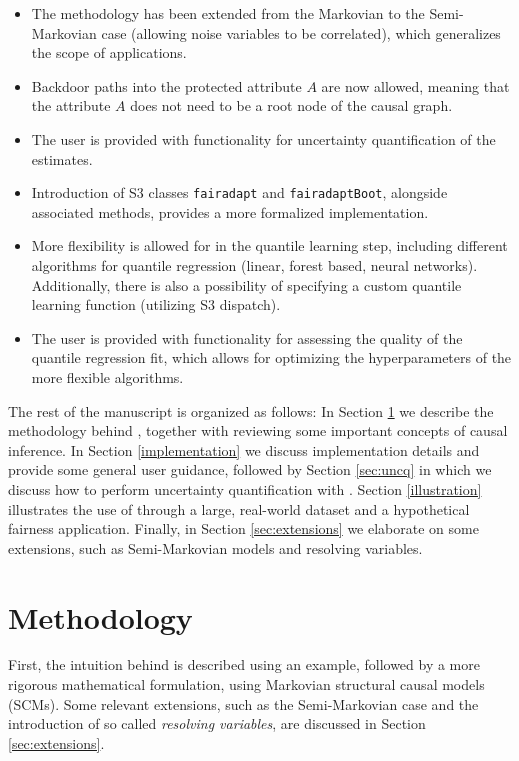 \documentclass[
  nojss]{jss}
\providecommand{\tightlist}{%
  \setlength{\itemsep}{0pt}\setlength{\parskip}{0pt}}
\begin{document}
\begin{itemize}
\tightlist
\item
  The methodology has been extended from the Markovian to the
  Semi-Markovian case (allowing noise variables to be correlated), which
  generalizes the scope of applications.
\item
  Backdoor paths into the protected attribute \(A\) are now allowed,
  meaning that the attribute \(A\) does not need to be a root node of
  the causal graph.
\item
  The user is provided with functionality for uncertainty quantification
  of the estimates.
\item
  Introduction of S3 classes \texttt{fairadapt} and
  \texttt{fairadaptBoot}, alongside associated methods, provides a more
  formalized implementation.
\item
  More flexibility is allowed for in the quantile learning step,
  including different algorithms for quantile regression (linear, forest
  based, neural networks). Additionally, there is also a possibility of
  specifying a custom quantile learning function (utilizing S3
  dispatch).
\item
  The user is provided with functionality for assessing the quality of
  the quantile regression fit, which allows for optimizing the
  hyperparameters of the more flexible algorithms.
\end{itemize}

The rest of the manuscript is organized as follows: In Section
\ref{methodology} we describe the methodology behind ,
together with reviewing some important concepts of causal inference. In
Section \ref{implementation} we discuss implementation details and
provide some general user guidance, followed by Section \ref{sec:uncq}
in which we discuss how to perform uncertainty quantification with
. Section \ref{illustration} illustrates the use of
 through a large, real-world dataset and a hypothetical
fairness application. Finally, in Section \ref{sec:extensions} we
elaborate on some extensions, such as Semi-Markovian models and
resolving variables.

\hypertarget{methodology}{%
\section{Methodology}\label{methodology}}

First, the intuition behind  is described using an
example, followed by a more rigorous mathematical formulation, using
Markovian structural causal models (SCMs). Some relevant extensions,
such as the Semi-Markovian case and the introduction of so called
\emph{resolving variables}, are discussed in Section
\ref{sec:extensions}.
\end{document}
